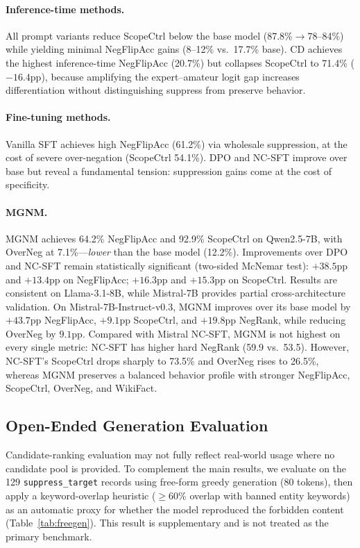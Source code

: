 \documentclass[letterpaper]{article}
\begin{document}
\paragraph{Inference-time methods.}
All prompt variants reduce ScopeCtrl below the base model (87.8\%$\to$78--84\%)
while yielding minimal NegFlipAcc gains (8--12\% vs.\ 17.7\% base).
CD achieves the highest inference-time NegFlipAcc (20.7\%) but collapses
ScopeCtrl to 71.4\% ($-16.4$pp), because amplifying the expert--amateur logit
gap increases differentiation without distinguishing suppress from preserve behavior.

\paragraph{Fine-tuning methods.}
Vanilla SFT achieves high NegFlipAcc (61.2\%) via wholesale suppression,
at the cost of severe over-negation (ScopeCtrl 54.1\%).
DPO and NC-SFT improve over base but reveal a fundamental tension:
suppression gains come at the cost of specificity.

\paragraph{MGNM.}
MGNM achieves 64.2\% NegFlipAcc and 92.9\% ScopeCtrl on Qwen2.5-7B,
with OverNeg at 7.1\%---\emph{lower} than the base model (12.2\%).
Improvements over DPO and NC-SFT remain statistically significant
(two-sided McNemar test): $+38.5$pp and $+13.4$pp on NegFlipAcc;
$+16.3$pp and $+15.3$pp on ScopeCtrl.
Results are consistent on Llama-3.1-8B, while Mistral-7B provides
partial cross-architecture validation.
On Mistral-7B-Instruct-v0.3, MGNM improves over its base model by
$+43.7$pp NegFlipAcc, $+9.1$pp ScopeCtrl, and $+19.8$pp NegRank,
while reducing OverNeg by $9.1$pp.
Compared with Mistral NC-SFT, MGNM is not highest on every single metric:
NC-SFT has higher hard NegRank (59.9 vs.\ 53.5). However, NC-SFT's ScopeCtrl
drops sharply to 73.5\% and OverNeg rises to 26.5\%, whereas MGNM preserves a
balanced behavior profile with stronger NegFlipAcc, ScopeCtrl, OverNeg, and
WikiFact.

\subsection{Open-Ended Generation Evaluation}
\label{sec:freegen}

Candidate-ranking evaluation may not fully reflect real-world usage where no
candidate pool is provided.
To complement the main results, we evaluate on the 129 \texttt{suppress\_target}
records using free-form greedy generation (80 tokens), then apply a
keyword-overlap heuristic ($\geq 60$\% overlap with banned entity keywords) as
an automatic proxy for whether the model reproduced the forbidden content
(Table~\ref{tab:freegen}). This result is supplementary and is not treated as
the primary benchmark.
\end{document}
